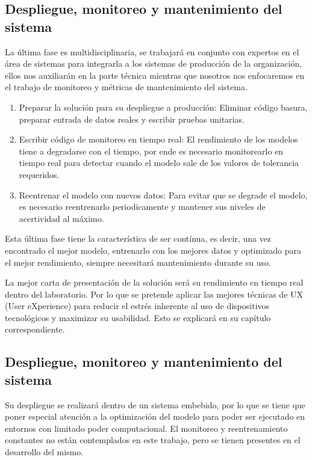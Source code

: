 \subsection{Despliegue, monitoreo y mantenimiento del sistema}

La última fase es multidisciplinaria, se trabajará en conjunto con expertos en
el área de sistemas para integrarla a los sistemas de producción de la
organización, ellos nos auxiliarán en la parte técnica mientras que nosotros nos
enfocaremos en el trabajo de monitoreo y métricas de mantenimiento del sistema.

\begin{enumerate}
    \item Preparar la solución para su despliegue a producción: Eliminar código
    basura, preparar entrada de datos reales y escribir pruebas unitarias.
    \item Escribir código de monitoreo en tiempo real: El rendimiento de los
    modelos tiene a degradarse con el tiempo, por ende es necesario monitorearlo
    en tiempo real para detectar cuando el modelo sale de los valores de
    tolerancia requeridos.
    \item Reentrenar el modelo con nuevos datos: Para evitar que se degrade el
    modelo, es necesario reentrenarlo periodicamente y mantener sus niveles de
    acertividad al máximo.
\end{enumerate}

Esta última fase tiene la característica de ser contínua, es decir, una vez
encontrado el mejor modelo, entrenarlo con los mejores datos y optimizado para
el mejor rendimiento, siempre necesitará mantenimiento durante su uso. 

La mejor carta de presentación de la solución será su rendimiento en tiempo real
dentro del laboratorio. Por lo que se pretende aplicar las mejores técnicas de
UX (User eXperience) para reducir el estrés inherente al uso de dispositivos
tecnológicos y maximizar su usabilidad. Esto se explicará en su capítulo
correspondiente.

\subsection{Despliegue, monitoreo y mantenimiento del sistema}

Su despliegue se realizará dentro de un sistema embebido, por lo que se tiene
que poner especial atención a la optimización del modelo para poder ser
ejecutado en entornos con limitado poder computacional. El monitoreo y
reentrenamiento constantes no están contemplados en este trabajo, pero se tienen
presentes en el desarrollo del mismo.